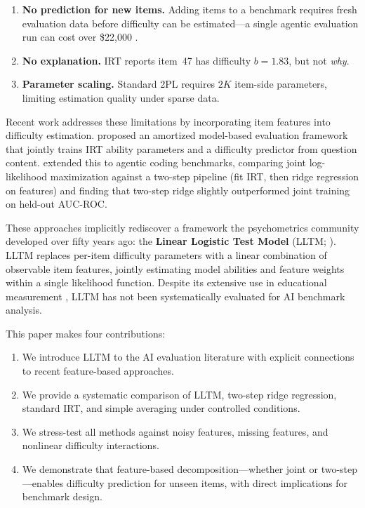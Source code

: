 \documentclass[11pt,a4paper]{article}
\begin{document}
\begin{enumerate}[nosep]
\item \textbf{No prediction for new items.} Adding items to a benchmark
requires fresh evaluation data before difficulty can be estimated---a
single agentic evaluation run can cost over \$22{,}000
\citep{zhang2025darwin}.
\item \textbf{No explanation.} IRT reports item~47 has difficulty
$b = 1.83$, but not \emph{why}.
\item \textbf{Parameter scaling.} Standard 2PL requires $2K$ item-side
parameters, limiting estimation quality under sparse data.
\end{enumerate}

Recent work addresses these limitations by incorporating item features
into difficulty estimation. \citet{truong2025reliable} proposed an
amortized model-based evaluation framework that jointly trains IRT
ability parameters and a difficulty predictor from question content.
\citet{ge2026agent} extended this to agentic coding benchmarks, comparing
joint log-likelihood maximization against a two-step pipeline (fit IRT,
then ridge regression on features) and finding that two-step ridge
slightly outperformed joint training on held-out AUC-ROC.

These approaches implicitly rediscover a framework the psychometrics
community developed over fifty years ago: the \textbf{Linear Logistic
Test Model} (LLTM; \citealp{fischer1973}). LLTM replaces per-item
difficulty parameters with a linear combination of observable item
features, jointly estimating model abilities and feature weights within a
single likelihood function. Despite its extensive use in educational
measurement \citep{embretson2000,baghaei2017}, LLTM has not been
systematically evaluated for AI benchmark analysis.

This paper makes four contributions:
\begin{enumerate}[nosep]
\item We introduce LLTM to the AI evaluation literature with explicit
connections to recent feature-based approaches.
\item We provide a systematic comparison of LLTM, two-step ridge
regression, standard IRT, and simple averaging under controlled
conditions.
\item We stress-test all methods against noisy features, missing features,
and nonlinear difficulty interactions.
\item We demonstrate that feature-based decomposition---whether joint or
two-step---enables difficulty prediction for unseen items, with direct
implications for benchmark design.
\end{enumerate}
\end{document}
